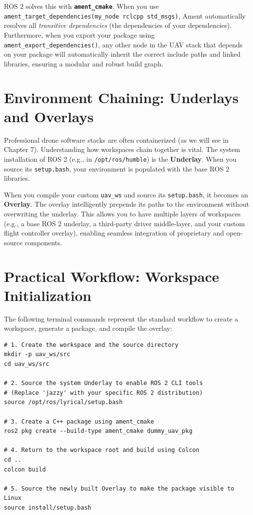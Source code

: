 \documentclass{article}
\begin{document}
ROS 2 solves this with \textbf{\texttt{ament\_cmake}}. When you use \texttt{ament\_target\_dependencies(my\_node rclcpp std\_msgs)}, 
Ament automatically resolves all \textit{transitive dependencies} (the dependencies of your dependencies). 
Furthermore, when you export your package using \texttt{ament\_export\_dependencies()}, any other node in the UAV stack that depends on your package will 
automatically inherit the correct include paths and linked libraries, ensuring a modular and robust build graph.

\section{Environment Chaining: Underlays and Overlays}
Professional drone software stacks are often containerized (as we will see in Chapter 7). 
Understanding how workspaces chain together is vital. 
The system installation of ROS 2 (e.g., in \texttt{/opt/ros/humble}) is the \textbf{Underlay}. 
When you source its \texttt{setup.bash}, your environment is populated with the base ROS 2 libraries.

When you compile your custom \texttt{uav\_ws} and source its \texttt{setup.bash}, it becomes an \textbf{Overlay}. 
The overlay intelligently prepends its paths to the environment without overwriting the underlay. 
This allows you to have multiple layers of workspaces (e.g., a base ROS 2 underlay, a third-party driver middle-layer, and your custom flight controller overlay),
enabling seamless integration of proprietary and open-source components.

\section{Practical Workflow: Workspace Initialization}
The following terminal commands represent the standard workflow to create a workspace, generate a package, and compile the overlay:

\begin{verbatim}
# 1. Create the workspace and the source directory
mkdir -p uav_ws/src
cd uav_ws/src

# 2. Source the system Underlay to enable ROS 2 CLI tools
# (Replace 'jazzy' with your specific ROS 2 distribution)
source /opt/ros/lyrical/setup.bash

# 3. Create a C++ package using ament_cmake
ros2 pkg create --build-type ament_cmake dummy_uav_pkg

# 4. Return to the workspace root and build using Colcon
cd ..
colcon build

# 5. Source the newly built Overlay to make the package visible to Linux
source install/setup.bash
\end{verbatim}
\end{document}
